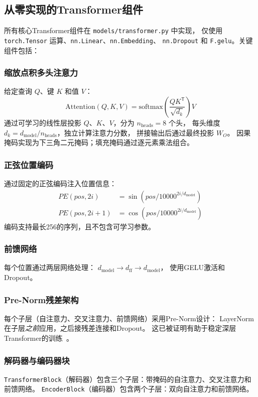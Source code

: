 \documentclass[11pt,a4paper]{article}
\begin{document}
\subsection{从零实现的Transformer组件}
\label{sec:components}

所有核心Transformer组件在 \texttt{models/transformer.py} 中实现，
仅使用 \texttt{torch.Tensor} 运算、\texttt{nn.Linear}、\texttt{nn.Embedding}、
\texttt{nn.Dropout} 和 \texttt{F.gelu}。关键组件包括：

\subsubsection*{缩放点积多头注意力}
给定查询 \(Q\)、键 \(K\) 和值 \(V\)：
\[
\text{Attention}(Q,K,V) =
    \text{softmax}\!\left(\frac{QK^{\mathsf{T}}}{\sqrt{d_k}}\right)V
\]
通过可学习的线性层投影 \(Q\)、\(K\)、\(V\)，分为 \(n_{\text{heads}}=8\) 个头，
每头维度 \(d_k = d_{\text{model}} / n_{\text{heads}}\)，独立计算注意力分数，
拼接输出后通过最终投影 \(W_O\)。
因果掩码实现为下三角二元掩码；填充掩码通过逐元素乘法组合。

\subsubsection*{正弦位置编码}
通过固定的正弦编码注入位置信息：
\[
\begin{aligned}
PE(pos, 2i)   &= \sin(pos / 10000^{2i/d_{\text{model}}}) \\
PE(pos, 2i+1) &= \cos(pos / 10000^{2i/d_{\text{model}}})
\end{aligned}
\]
编码支持最长256的序列，且不包含可学习参数。

\subsubsection*{前馈网络}
每个位置通过两层网络处理：
\(d_{\text{model}} \to d_{\text{ff}} \to d_{\text{model}}\)，
使用GELU激活和Dropout。

\subsubsection*{Pre-Norm残差架构}
每个子层（自注意力、交叉注意力、前馈网络）采用Pre-Norm设计：
LayerNorm在子层\emph{之前}应用，之后接残差连接和Dropout。
这已被证明有助于稳定深层Transformer的训练~\cite{xiong2020layer}。

\subsubsection*{解码器与编码器块}
\texttt{TransformerBlock}（解码器）包含三个子层：带掩码的自注意力、交叉注意力和前馈网络。
\texttt{EncoderBlock}（编码器）包含两个子层：双向自注意力和前馈网络。
\end{document}
